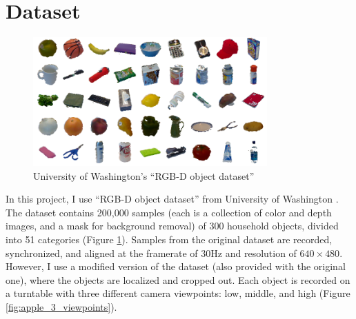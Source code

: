\section{Dataset}\label{sec:dataset}

\begin{figure}
	\centering
    \includegraphics[width=0.8\textwidth]{images/rgbd_dataset}
    \caption{University of Washington's ``RGB-D object dataset''}
    \label{fig:rgb_dataset}
\end{figure}

In this project, I use ``RGB-D object dataset'' from University of Washington \cite{Lai2011_rgbddata}. The dataset contains 200,000 samples (each is a collection of color and depth images, and a mask for background removal) of 300 household objects, divided into 51 categories (Figure \ref{fig:rgb_dataset}). Samples from the original dataset are recorded, synchronized, and aligned at the framerate of 30Hz and resolution of $640 \times 480$. However, I use a modified version of the dataset (also provided with the original one), where the objects are localized and cropped out. Each object is recorded on a turntable with three different camera viewpoints: low, middle, and high (Figure \ref{fig:apple_3_viewpoints}).

